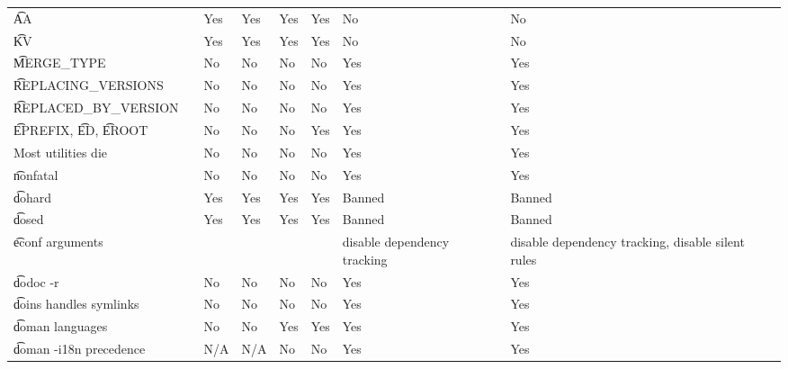 \begin{landscape}
\begin{longtable}{llP{5em}P{5em}P{6em}P{6em}P{6em}P{6em}}
\t{AA} &  &
    Yes & Yes & Yes & Yes & No & No \\

\t{KV} &  &
    Yes & Yes & Yes & Yes & No & No \\

\t{MERGE\_TYPE} &  &
    No & No & No & No & Yes & Yes \\

\t{REPLACING\_VERSIONS} &  &
    No & No & No & No & Yes & Yes \\

\t{REPLACED\_BY\_VERSION} &  &
    No & No & No & No & Yes & Yes \\

\t{EPREFIX}, \t{ED}, \t{EROOT} &  &
    No & No & No & Yes & Yes & Yes \\

Most utilities die &  &
    No & No & No & No & Yes & Yes \\

\t{nonfatal} &  &
    No & No & No & No & Yes & Yes \\

\t{dohard} &  &
    Yes & Yes & Yes & Yes & Banned & Banned \\

\t{dosed} &  &
    Yes & Yes & Yes & Yes & Banned & Banned \\

\t{econf} arguments &  &
    &  &  &  & disable dependency tracking & disable dependency tracking, disable silent rules \\

\t{dodoc -r} &  &
    No & No & No & No & Yes & Yes \\

\t{doins} handles symlinks &  &
    No & No & No & No & Yes & Yes \\

\t{doman} languages &  &
    No & No & Yes & Yes & Yes & Yes \\

\t{doman -i18n} precedence &  &
    N/A & N/A & No & No & Yes & Yes \\


\end{longtable}
\end{landscape}
